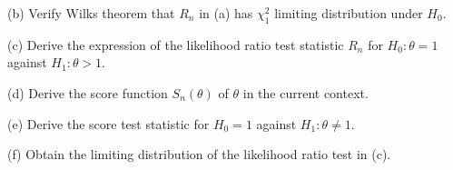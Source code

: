 \begin{enumerate}
(b) Verify Wilks theorem that $R_n$ in 
(a) has $\chi_1^2$ limiting distribution under $H_0$.


(c) Derive the expression of the likelihood ratio test statistic $R_n$ for 
$H_0: \theta = 1$ against $H_1: \theta > 1$.

(d) Derive the score function $S_n(\theta)$ of $\theta$ in the current context.

(e) Derive the score test statistic  for $H_0= 1$ against $H_1: \theta \neq 1$.

(f) Obtain the limiting distribution of the likelihood ratio test in (c).


\end{enumerate}
